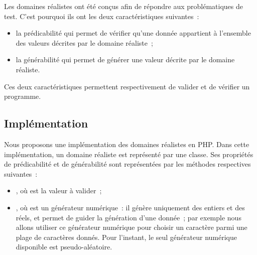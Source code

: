 \begin{definition}
\label{definition:language:realdom}

Les domaines réalistes ont été conçus afin de répondre aux problématiques de
test. C'est pourquoi ils ont les deux caractéristiques suivantes~:

\begin{itemize}

\item la {\strong prédicabilité} qui permet de vérifier qu'une donnée appartient
à l'ensemble des valeurs décrites par le domaine réaliste~;

\item la {\strong générabilité} qui permet de générer une valeur décrite par le
domaine réaliste.

\end{itemize}

\end{definition}

Ces deux caractéristiques permettent respectivement de {\strong valider} et de
{\strong vérifier} un programme.

\subsection{Implémentation}
\label{subsection:language:realdom:implementation}

Nous proposons une implémentation des domaines réalistes en PHP. Dans cette
implémentation, un domaine réaliste est représenté par une {\strong classe}.
Ses propriétés de prédicabilité et de générabilité sont représentées par les
{\strong méthodes} respectives suivantes~:

\begin{itemize}

\item {}, où  est la valeur à valider~;

\item {}, où  est un {\strong générateur
numérique}~: il génère uniquement des entiers et des réels, et permet de guider
la génération d'une donnée~; par exemple nous allons utiliser ce générateur
numérique pour choisir un caractère parmi une plage de caractères donnés.  Pour
l'instant, le seul générateur numérique disponible est pseudo-aléatoire.

\end{itemize}


